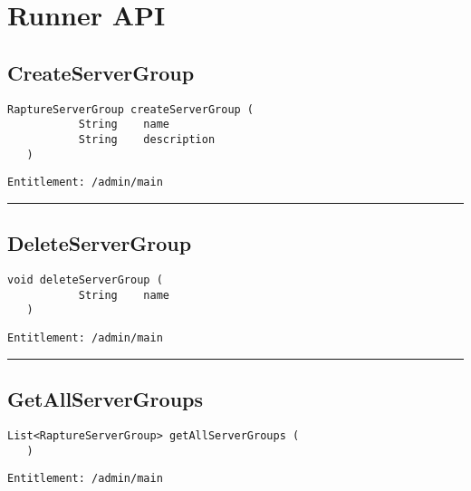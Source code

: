 \chapter{Runner API}

\section{CreateServerGroup}
\label{Api:CreateServerGroup}
\begin{lstlisting}[style=nonumbers]
   RaptureServerGroup createServerGroup (
           String    name
           String    description
   )
\end{lstlisting}
\begin{Verbatim}[formatcom=\color{Maroon}]
  Entitlement: /admin/main
\end{Verbatim}



\rule{12cm}{2pt}
\section{DeleteServerGroup}
\label{Api:DeleteServerGroup}
\begin{lstlisting}[style=nonumbers]
   void deleteServerGroup (
           String    name
   )
\end{lstlisting}
\begin{Verbatim}[formatcom=\color{Maroon}]
  Entitlement: /admin/main
\end{Verbatim}



\rule{12cm}{2pt}
\section{GetAllServerGroups}
\label{Api:GetAllServerGroups}
\begin{lstlisting}[style=nonumbers]
   List<RaptureServerGroup> getAllServerGroups (
   )
\end{lstlisting}
\begin{Verbatim}[formatcom=\color{Maroon}]
  Entitlement: /admin/main
\end{Verbatim}




